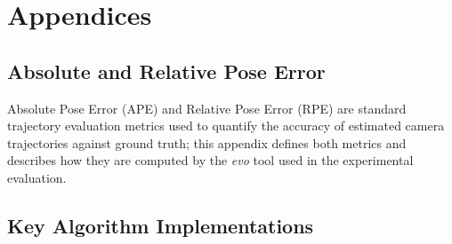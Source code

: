 \appendix 
\section{Appendices}

\subsection{Absolute and Relative Pose Error}
\label{sec:ape_rpe}

Absolute Pose Error (APE) and Relative Pose Error (RPE) are standard trajectory evaluation metrics used to quantify the accuracy of estimated camera trajectories against ground truth; this appendix defines both metrics and describes how they are computed by the \textit{evo} tool used in the experimental evaluation.

\subsection{Key Algorithm Implementations}
\label{sec:key_algorithm_impl}

